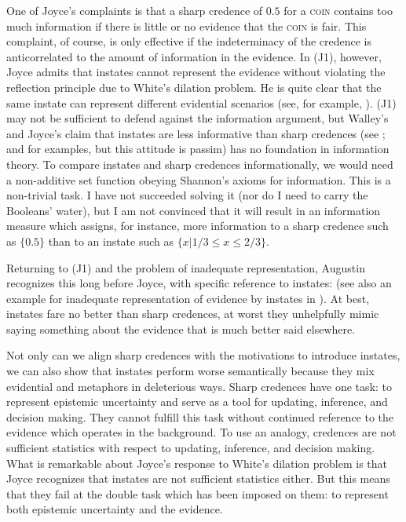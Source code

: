 \documentclass[11pt]{article}
\begin{document}
One of Joyce's complaints is that a sharp credence of $0.5$ for a
\textsc{coin} contains too much information if there is little or no
evidence that the \textsc{coin} is fair. This complaint, of course, is
only effective if the indeterminacy of the credence is anticorrelated
to the amount of information in the evidence. In (J1), however, Joyce
admits that instates cannot represent the evidence without violating
the reflection principle due to White's dilation problem. He is quite
clear that the same instate can represent different evidential
scenarios (see, for example, ). (J1) may not be
sufficient to defend against the information argument, but Walley's
and Joyce's claim that instates are less informative than sharp
credences (see ; and 
for examples, but this attitude is passim) has no foundation in
information theory. To compare instates and sharp credences
informationally, we would need a non-additive set function obeying
Shannon's axioms for information. This is a non-trivial task. I have
not succeeded solving it (nor do I need to carry the Booleans' water),
but I am not convinced that it will result in an information measure
which assigns, for instance, more information to a sharp credence such
as $\{0.5\}$ than to an instate such as $\{x|1/3\leq{}x\leq{}2/3\}$.

Returning to (J1) and the problem of inadequate representation,
Augustin recognizes this long before Joyce, with specific reference to
instates:   (see
also an example for inadequate representation of evidence by instates
in ). At best, instates fare no better
than sharp credences, at worst they unhelpfully mimic saying something
about the evidence that is much better said elsewhere.

Not only can we align sharp credences with the motivations to
introduce instates, we can also show that instates perform worse
semantically because they mix evidential and {\doxnotep} metaphors in
deleterious ways. Sharp credences have one task: to represent
epistemic uncertainty and serve as a tool for updating, inference, and
decision making. They cannot fulfill this task without continued
reference to the evidence which operates in the background. To use an
analogy, credences are not sufficient statistics with respect to
updating, inference, and decision making. What is remarkable about
Joyce's response to White's dilation problem is that Joyce recognizes
that instates are not sufficient statistics either. But this means
that they fail at the double task which has been imposed on them: to
represent both epistemic uncertainty and the evidence.
\end{document}
